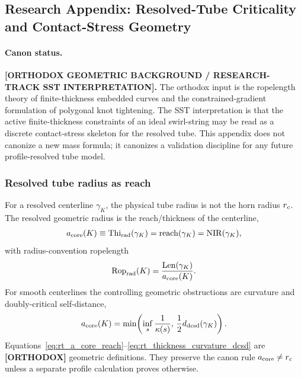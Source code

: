 \subsection{Research Appendix: Resolved-Tube Criticality and Contact-Stress Geometry}
\label{app:resolved_tube_contact_stress_geometry}

\paragraph{Canon status.}
\textbf{[ORTHODOX GEOMETRIC BACKGROUND / RESEARCH-TRACK SST INTERPRETATION].}
The orthodox input is the ropelength theory of finite-thickness embedded
curves and the constrained-gradient formulation of polygonal knot tightening.
The SST interpretation is that the active finite-thickness constraints of an
ideal swirl-string may be read as a discrete contact-stress skeleton for the
resolved tube.  This appendix does not canonize a new mass formula; it
canonizes a validation discipline for any future profile-resolved tube model.

\subsubsection{Resolved tube radius as reach}
For a resolved centerline $\gamma_K$, the physical tube radius is not the horn
radius $r_c$.  The resolved geometric radius is the reach/thickness of the
centerline,
\begin{align}
    a_{\rm core}(K)
    \equiv
    \operatorname{Thi}_{\rm rad}(\gamma_K)
    =
    \operatorname{reach}(\gamma_K)
    =
    \operatorname{NIR}(\gamma_K),
    \label{eq:rt_a_core_reach}
\end{align}
with radius-convention ropelength
\begin{align}
    \operatorname{Rop}_{\rm rad}(K)
    =
    \frac{\operatorname{Len}(\gamma_K)}{a_{\rm core}(K)}.
    \label{eq:rt_rop_radius_convention}
\end{align}
For smooth centerlines the controlling geometric obstructions are curvature
and doubly-critical self-distance,
\begin{align}
    a_{\rm core}(K)
    =
    \min\!\left(
        \inf_s\frac{1}{\kappa(s)},\,
        \frac12 d_{\rm dcsd}(\gamma_K)
    \right).
    \label{eq:rt_thickness_curvature_dcsd}
\end{align}
Equations~\eqref{eq:rt_a_core_reach}--\eqref{eq:rt_thickness_curvature_dcsd}
are \textbf{[ORTHODOX]} geometric definitions.  They preserve the canon rule
$a_{\rm core}\neq r_c$ unless a separate profile calculation proves otherwise.

